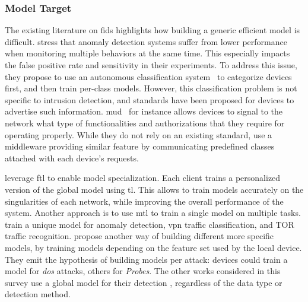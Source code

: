 \subsubsection{Model Target\label{sec:sota.quali.target}}

The existing literature on \gls{fids} highlights how building a generic efficient model is difficult.
\textcite{nguyen_DIoTFederatedSelflearning_2019} stress that anomaly detection systems suffer from lower performance when monitoring multiple behaviors at the same time.
This especially impacts the false positive rate and sensitivity in their experiments.
To address this issue, they propose to use an autonomous classification system~\cite{marchal_AuDIAutonomousIoT_2019} to categorize devices first, and then train per-class models.
However, this classification problem is not specific to intrusion detection, and standards have been proposed for devices to advertise such information.
\Gls{mud}~\cite{MUD_rfc} for instance allows devices to signal to the network what type of functionalities and authorizations that they require for operating properly.
While they do not rely on an existing standard, \textcite{pahl_AllEyesYou_2018} use a middleware providing similar feature by communicating predefined classes attached with each device's requests.

\textcite{fan_IoTDefenderFederatedTransfer_2020} leverage \gls{ftl} to enable model specialization.
Each client trains a personalized version of the global model using \gls{tl}.
This allows to train models accurately on the singularities of each network, while improving the overall performance of the system.
Another approach is to use \gls{mtl} to train a single model on multiple tasks.
\textcite{zhao_MultiTaskNetworkAnomaly_2019} train a unique model for anomaly detection, \gls{vpn} traffic classification, and TOR traffic recognition.
\textcite{qin_FederatedLearningBasedNetwork_2021} propose another way of building different more specific models, by training models depending on the feature set used by the local device.
They emit the hypothesis of building models per attack: devices could train a model for \emph{\gls{dos}} attacks, others for \emph{Probes}.
The other works considered in this survey use a global model for their detection \cite{zhang_BlockchainbasedFederatedLearning_2020,schneble_Attackdetectionusing_2019,li_DeepFedFederatedDeep_2020,chen_Networkanomalydetection_2020,rahman_InternetThingsIntrusion_2020,al-athbaal-marri_FederatedMimicLearning_2020,kim_CollaborativeAnomalyDetection_2020,qin_LineSpeedScalableIntrusion_2020a,chen_IntrusionDetectionWireless_2020,hei_trustedfeatureaggregator_2020,li_DeepFedFederatedDeep_2020,popoola_FederatedDeepLearning_2021a}, regardless of the data type or detection method.


